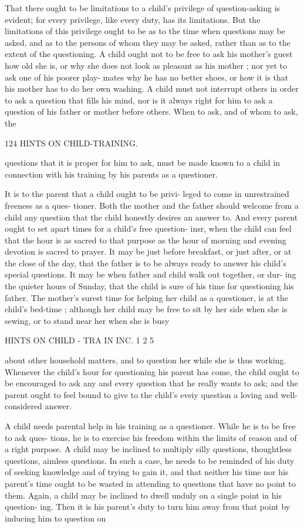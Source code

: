 \documentclass[
]{book}
\begin{document}
That there ought to be limitations to a child's privilege of question-asking is evident; for every privilege, like every duty, has its limitations. But the limitations of this privilege ought to be as to the time when questions may be asked, and as to the persons of whom they may be asked, rather than as to the extent of the questioning. A child ought not to be free to ask his mother's guest how old she is, or why she does not look as pleasant as his mother ; nor yet to ask one of his poorer play- mates why he has no better shoes, or how it is that his mother has to do her own washing. A child must not interrupt others in order to ask a question that fills his mind, nor is it always right for him to ask a question of his father or mother before others. When to ask, and of whom to ask, the

124 HINTS ON CHILD-TRAINING.

questions that it is proper for him to ask, must be made known to a child in connection with his training by his parents as a questioner.

It is to the parent that a child ought to be privi- leged to come in unrestrained freeness as a ques- tioner. Both the mother and the father should welcome from a child any question that the child honestly desires an answer to. And every parent ought to set apart times for a child's free question- insr, when the child can feel that the hour is as sacred to that purpose as the hour of morning and evening devotion is sacred to prayer. It may be just before breakfast, or just after, or at the close of the day, that the father is to be always ready to answer his child's special questions. It may be when father and child walk out together, or dur- ing the quieter hours of Sunday, that the child is sure of his time for questioning his father. The mother's surest time for helping her child as a questioner, is at the child's bed-time ; although her child may be free to sit by her side when she is sewing, or to stand near her when she is busy

HINTS ON CHILD - TRA IN INC. 1 2 5

about other household matters, and to question her while she is thus working. Whenever the child's hour for questioning his parent has come, the child ought to be encouraged to ask any and every question that he really wants to ask; and the parent ought to feel bound to give to the child's eveiy question a loving and well-considered answer.

A child needs parental help in his training as a questioner. While he is to be free to ask ques- tions, he is to exercise his freedom within the limits of reason and of a right purpose. A child may be inclined to multiply silly questions, thoughtless questions, aimless questions. In such a case, he needs to be reminded of his duty of seeking knowledge and of trying to gain it, and that neither his time nor his parent's time ought to be wasted in attending to questions that have no point to them. Again, a child may be inclined to dwell unduly on a single point in his question- ing. Then it is his parent's duty to turn him away from that point by inducing him to question on
\end{document}
